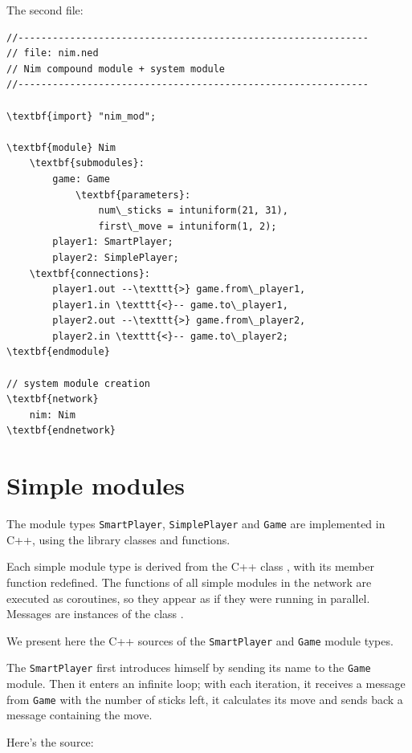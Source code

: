The second file:

\begin{Verbatim}[commandchars=\\\{\}]
//-------------------------------------------------------------
// file: nim.ned
// Nim compound module + system module
//-------------------------------------------------------------

\textbf{import} "nim_mod";

\textbf{module} Nim
    \textbf{submodules}:
        game: Game
            \textbf{parameters}:
                num\_sticks = intuniform(21, 31),
                first\_move = intuniform(1, 2);
        player1: SmartPlayer;
        player2: SimplePlayer;
    \textbf{connections}:
        player1.out --\texttt{>} game.from\_player1,
        player1.in \texttt{<}-- game.to\_player1,
        player2.out --\texttt{>} game.from\_player2,
        player2.in \texttt{<}-- game.to\_player2;
\textbf{endmodule}

// system module creation
\textbf{network}
    nim: Nim
\textbf{endnetwork}
\end{Verbatim}



\section{Simple modules}

The module types \texttt{SmartPlayer}, \texttt{SimplePlayer} and \texttt{Game} are implemented
in C++, using the {\opp} library classes and functions.

Each simple module type is derived from the C++
class , with its  member
function redefined. The  functions of all
simple modules in the network are executed as
coroutines, so they appear as if they were running in
parallel.  Messages are instances of the class .

We present here the C++ sources of the \texttt{SmartPlayer} and \texttt{Game} module
types.

The \texttt{SmartPlayer} first introduces himself by sending its name
to the \texttt{Game} module. Then it enters an infinite loop; with each
iteration, it receives a message from \texttt{Game} with the number of
sticks left, it calculates its move and sends back a message
containing the move.

Here's the source:

